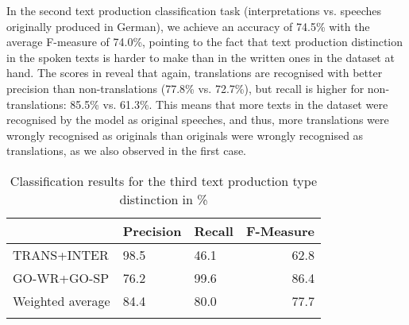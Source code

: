 \documentclass[output=paper,colorlinks,citecolor=brown]{langscibook}
\begin{document}
In the second text production classification task (interpretations vs. speeches originally produced in German), we achieve an accuracy of 74.5\% with the average F-measure of 74.0\%, pointing to the fact that text production distinction in the spoken texts is harder to make than in the written ones in the dataset at hand.  The scores in  reveal that again, translations are recognised with better precision than non-translations (77.8\% vs. 72.7\%), but recall is higher for non-translations: 85.5\% vs. 61.3\%. %
This means that more texts in the dataset were recognised by the model as original speeches, and thus, more translations were wrongly recognised as originals than originals were wrongly recognised as translations, as we also observed in the first case. %
  
 
\begin{table}
    \begin{tabularx}{\textwidth}{XYYr}
\lsptoprule
 &\bf Precision & \bf Recall & \bf F-Measure\\
\midrule
TRANS+INTER &   98.5 & 46.1  & 62.8    \\
GO-WR+GO-SP &   76.2   & 99.6  & 86.4    \\
Weighted average &  84.4 & 80.0 & 77.7 \\
\lspbottomrule
    \end{tabularx}
    \caption{Classification results for the third text production type distinction in \%}
    \label{tab:rq1-3}
\end{table}
\end{document}

